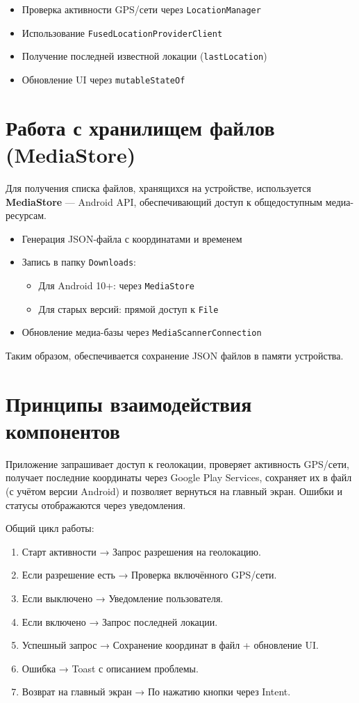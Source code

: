 \begin{itemize}
    \item Проверка активности GPS/сети через \verb|LocationManager|
    \item Использование \verb|FusedLocationProviderClient|
    \item Получение последней известной локации (\verb|lastLocation|)
    \item Обновление UI через \verb|mutableStateOf|
\end{itemize}

\section{Работа с хранилищем файлов (MediaStore)}

Для получения списка файлов, хранящихся на устройстве, используется \textbf{MediaStore} — Android API, обеспечивающий доступ к общедоступным медиа-ресурсам.

\begin{itemize}
        \item Генерация JSON-файла с координатами и временем
        \item Запись в папку \verb|Downloads|:
            \begin{itemize}
                \item Для Android 10+: через \verb|MediaStore|
                \item Для старых версий: прямой доступ к \verb|File|
            \end{itemize}
        \item Обновление медиа-базы через \verb|MediaScannerConnection|
    \end{itemize}

Таким образом, обеспечивается сохранение JSON файлов в памяти устройства.

\section{Принципы взаимодействия компонентов}

Приложение запрашивает доступ к геолокации, проверяет активность GPS/сети, получает последние координаты через Google Play Services, сохраняет их в файл (с учётом версии Android) и позволяет вернуться на главный экран. Ошибки и статусы отображаются через уведомления.

Общий цикл работы:

\begin{enumerate}
    \item Старт активности → Запрос разрешения на геолокацию.
    \item Если разрешение есть → Проверка включённого GPS/сети.
    \item Если выключено → Уведомление пользователя.
    \item Если включено → Запрос последней локации.
    \item Успешный запрос → Сохранение координат в файл + обновление UI.
    \item Ошибка → Toast с описанием проблемы.
    \item Возврат на главный экран → По нажатию кнопки через Intent.
\end{enumerate}

